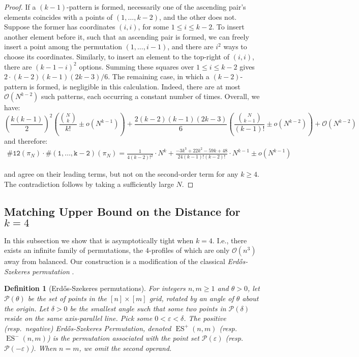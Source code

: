 \documentclass{article}
\newtheorem{definition}[theorem]{Definition}
\newcommand{\pc}[2]{{\# \mathtt{ #1 } \left( #2 \right)}}
\DeclareMathOperator{\ES}{ES}
\newcommand{\ESZ}{Erd\H{o}s-Szekeres\xspace}
\theoremstyle{remark}
\theoremstyle{plain}
\begin{document}
\begin{proof}
    If a $(k-1)$-pattern is formed, necessarily one of the ascending pair's elements coincides with a points of $(1,\ldots,k-2)$, and the other does not. Suppose the former has coordinates $(i,i)$, for some $1\leq i\leq k-2$. To insert another element before it, such that an ascending pair is formed, we can freely insert a point among the permutation $(1,\ldots,i-1)$, and there are $i^2$ ways to choose its coordinates. Similarly, to insert an element to the top-right of $(i,i)$, there are $(k-1-i)^2$ options. Summing these squares over $1\leq i\leq k-2$ gives $2\cdot (k-2)(k-1)(2k-3)/6$. The remaining case, in which a $(k-2)$-pattern is formed, is negligible in this calculation. Indeed, there are at most $\mathcal{O}(N^{k-2})$ such patterns, each occurring a constant number of times. Overall, we have:
    \[
        \left(\frac{k(k-1)}{2}\right)^2 \left( \frac{\binom{N}{k}}{k!} \pm o(N^{k-1}) \right) + \frac{2(k-2)(k-1)(2k-3)}{6} \left( \frac{\binom{N}{k-1}}{(k-1)!} \pm o(N^{k-2}) \right) + \mathcal{O}(N^{k-2})
    \]
    and therefore:
    \begin{align}
        \label{eq:12k_second}
        \pc{12}{\pi_N} \cdot \pc{(1,\ldots,k-2)}{\pi_N} = \frac{1}{4(k-2)!^2} \cdot N^k + \frac{-3k^3 +22k^2 -59k+48}{24(k-1)!(k-2)!}\cdot N^{k-1} \pm o(N^{k-1})
    \end{align}
    
     and  agree on their leading terms, but not on the second-order term for any $k \ge 4$. The contradiction follows by taking a sufficiently large $N$.
\end{proof}

\subsection{Matching Upper Bound on the Distance for \texorpdfstring{$k=4$}{k=4}}
\label{subsect:upperbound}
In this subsection we show that  is asymptotically tight when $k=4$. I.e., there exists an infinite family of permutations, the $4$-profiles of which are only $\mathcal{O}(n^{3})$ away from balanced. Our construction is a modification of the classical \emph{\ESZ permutation} \cite{erdos1935combinatorial}.

\begin{definition}[\ESZ permutations]\label{def:esz}
    \label{defn:erdos_szekeres}
    For integers $n,m \ge 1$ and $\theta>0$, let $\mathcal{P}(\theta)$ be the set of points in the $[n] \times [m]$ grid, rotated by an angle of $\theta$ about the origin. Let $\delta>0$ be the smallest angle such that some two points in $\mathcal{P}(\delta)$ reside on the same axis-parallel line. Pick some $0<\varepsilon<\delta$. The positive (resp.\ negative) \ESZ Permutation, denoted $\ES^+(n,m)$ (resp.\ $\ES^-(n,m)$) is the permutation associated with the point set $\mathcal{P}(\varepsilon)$ (resp.\ $\mathcal{P}(-\varepsilon)$). When $n=m$, we omit the second operand.
\end{definition}
\end{document}
